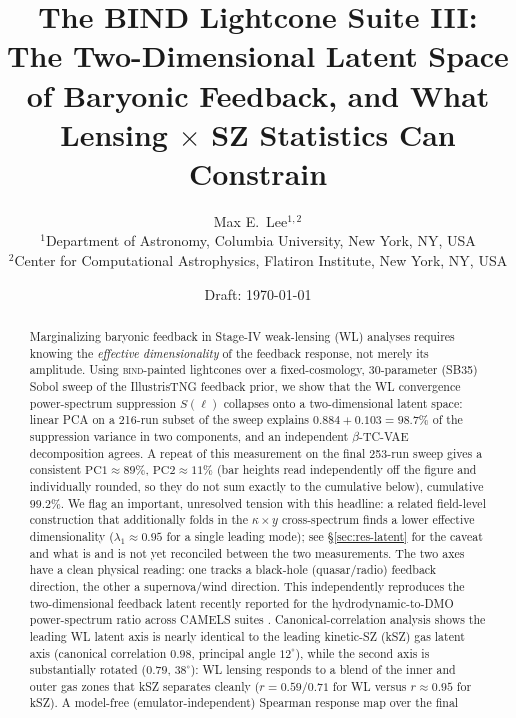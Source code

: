 \documentclass[11pt]{article}
\title{The BIND Lightcone Suite III: The Two-Dimensional Latent Space of
Baryonic Feedback, and What Lensing $\times$ SZ Statistics Can Constrain}
\author{%
  Max E.\ Lee$^{1,2}$ \todo{author list to be finalized}\\[2pt]
  \small $^1$Department of Astronomy, Columbia University, New York, NY, USA\\
  \small $^2$Center for Computational Astrophysics, Flatiron Institute, New York, NY, USA
}
\date{Draft: \today}
\newcommand{\bind}{\textsc{bind}}
\newcommand{\Sell}{S(\ell)}                    %
\newcommand{\kappay}{\kappa\times y}
\begin{document}
\maketitle

\begin{abstract}
Marginalizing baryonic feedback in Stage-IV weak-lensing (WL) analyses
requires knowing the \emph{effective dimensionality} of the feedback
response, not merely its amplitude.
Using \bind{}-painted lightcones over a fixed-cosmology, 30-parameter
(SB35) Sobol sweep of the IllustrisTNG feedback prior, we show that the WL
convergence power-spectrum suppression $\Sell$ collapses onto a
two-dimensional latent space: linear PCA on a 216-run subset of the sweep
explains $0.884+0.103=98.7\%$ of the suppression variance in two
components, and an independent $\beta$-TC-VAE decomposition agrees. %
A repeat of this measurement on the final 253-run sweep gives a consistent
$\mathrm{PC1}\!\approx\!89\%$, $\mathrm{PC2}\!\approx\!11\%$ (bar heights
read independently off the figure and individually rounded, so they do not
sum exactly to the cumulative below), cumulative
$99.2\%$. %
We flag an important, unresolved tension with this headline: a related
field-level construction that additionally folds in the $\kappay$
cross-spectrum finds a lower effective dimensionality ($\lambda_1\approx0.95$
for a single leading mode); see \S\ref{sec:res-latent} for the caveat and
what is and is not yet reconciled between the two measurements.
The two axes have a clean physical reading: one tracks a black-hole
(quasar/radio) feedback direction, the other a supernova/wind direction. %
This independently reproduces the two-dimensional feedback latent recently
reported for the hydrodynamic-to-DMO power-spectrum ratio across CAMELS
suites \citep{Lin2026latent}.
Canonical-correlation analysis shows the leading WL latent axis is nearly
identical to the leading kinetic-SZ (kSZ) gas latent axis (canonical
correlation $0.98$, principal angle $12^\circ$), while the second axis is
substantially rotated ($0.79$, $38^\circ$): WL lensing responds to a blend
of the inner and outer gas zones that kSZ separates cleanly
($r=0.59/0.71$ for WL versus $r\approx0.95$ for kSZ). %
A model-free (emulator-independent) Spearman response map over the final

\end{abstract}
\end{document}
